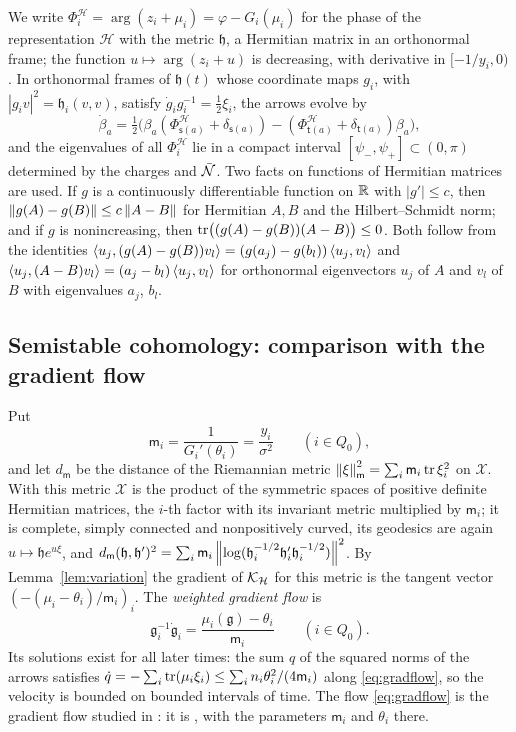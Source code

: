 We write $\Phi^{\mathcal H}_i=\arg(z_i+\mu_i)=\varphi-G_i(\mu_i)$ for the
phase of the representation $\mathcal H$ with the metric $\mathfrak h$, a
Hermitian matrix in an orthonormal frame; the function
$u\mapsto\arg(z_i+u)$ is decreasing, with derivative in $[-1/y_i,0)$. In
orthonormal frames of $\mathfrak h(t)$ whose coordinate maps $g_i$, with
$|g_iv|^2=\mathfrak h_i(v,v)$, satisfy $\dot g_ig_i^{-1}=\frac12\xi_i$, the
arrows evolve by
\begin{equation}\label{eq:betaflow}
 \dot\beta_a=\tfrac12\bigl(\beta_a(\Phi^{\mathcal H}_{\mathsf s(a)}+\delta_{\mathsf s(a)})
 -(\Phi^{\mathcal H}_{\mathsf t(a)}+\delta_{\mathsf t(a)})\beta_a\bigr),
\end{equation}
and the eigenvalues of all $\Phi^{\mathcal H}_i$ lie in a compact interval
$[\psi_-,\psi_+]\subset(0,\pi)$ determined by the charges and $\bar{\mathcal N}$. Two
facts on functions of Hermitian matrices are used. If $g$ is a continuously
differentiable function on $\mathbb R$ with $|g'|\leq c$, then
$\left\lVert g(A)-g(B)\right\rVert\leq c\left\lVert A-B\right\rVert$ for Hermitian $A,B$ and the
Hilbert--Schmidt norm; and if $g$ is nonincreasing, then
$\operatorname{tr}\bigl((g(A)-g(B))(A-B)\bigr)\leq0$. Both follow from the identities
$\left\langle u_j,(g(A)-g(B))v_l\right\rangle=(g(a_j)-g(b_l))\left\langle u_j,v_l\right\rangle$ and
$\left\langle u_j,(A-B)v_l\right\rangle=(a_j-b_l)\left\langle u_j,v_l\right\rangle$ for orthonormal
eigenvectors $u_j$ of $A$ and $v_l$ of $B$ with eigenvalues $a_j$, $b_l$.

\subsection{Semistable cohomology: comparison with the gradient flow}
Put
\[
 \mathsf m_i=\frac1{G_i'(\theta_i)}=\frac{y_i}{\sigma^2}\qquad(i\in Q_0),
\]
and let $d_{\mathsf m}$ be the distance of the Riemannian metric
$\left\lVert\xi\right\rVert_{\mathsf m}^2=\sum_i\mathsf m_i\operatorname{tr}\xi_i^2$ on $\mathcal X$. With
this metric $\mathcal X$ is the product of the symmetric spaces of positive
definite Hermitian matrices, the $i$-th factor with its invariant metric
multiplied by $\mathsf m_i$; it is complete, simply connected and
nonpositively curved, its geodesics are again
$u\mapsto\mathfrak he^{u\xi}$, and
$d_{\mathsf m}(\mathfrak h,\mathfrak h')^2=\sum_i\mathsf m_i\left\lVert\log(\mathfrak h_i^{-1/2}\mathfrak h_i'\mathfrak h_i^{-1/2})\right\rVert^2$.
By Lemma~\ref{lem:variation} the gradient of $\mathcal K_{\mathcal H}$ for this
metric is the tangent vector $(-(\mu_i-\theta_i)/\mathsf m_i)_i$. The
\emph{weighted gradient flow} is
\begin{equation}\label{eq:gradflow}
 \mathfrak g_i^{-1}\dot{\mathfrak g}_i=\frac{\mu_i(\mathfrak g)-\theta_i}{\mathsf m_i}\qquad(i\in Q_0).
\end{equation}
Its solutions exist for all later times: the sum $q$ of the squared norms of
the arrows satisfies
$\dot q=-\sum_i\operatorname{tr}(\mu_i\xi_i)\leq\sum_in_i\theta_i^2/(4\mathsf m_i)$ along
\eqref{eq:gradflow}, so the velocity is bounded on bounded intervals of
time. The flow \eqref{eq:gradflow} is the gradient flow studied in
\cite{hkkp23}: it is \cite[(5.11)]{hkkp23}, with the parameters
$\mathsf m_i$ and $\theta_i$ there.

